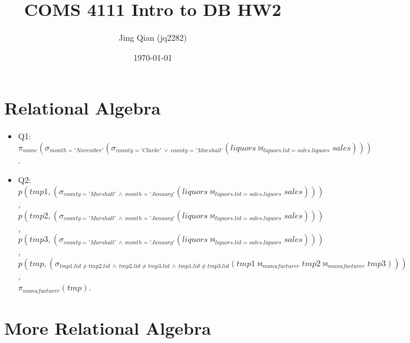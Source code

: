 \documentclass{article}
\title{COMS 4111 Intro to DB HW2}
\author{Jing Qian (jq2282)}
\date{\today}
\begin{document}
\maketitle



\pagebreak

\section{Relational Algebra}
\begin{itemize}
    \item Q1: \\
    $\pi_{name} (\sigma_{month='November'} (\sigma_{county='Clarke'\ \lor\ county = 'Marshall'} (liquors \bowtie_{liquors.lid = sales.liquors}sales))) $.
    
    \item Q2: \\
    $p(tmp1, (\sigma_{county = 'Marshall'\ \land\ month = 'January'} (liquors \bowtie_{liquors.lid = sales.liquors}sales)))$, \\
    $p(tmp2, (\sigma_{county = 'Marshall'\ \land\ month = 'January'} (liquors \bowtie_{liquors.lid = sales.liquors}sales)))$, \\
    $p(tmp3, (\sigma_{county = 'Marshall'\ \land\ month = 'January'} (liquors \bowtie_{liquors.lid = sales.liquors}sales)))$, \\
    $p(tmp, (\sigma_{tmp1.lid \neq tmp2.lid\ \land\ tmp2.lid \neq tmp3.lid\ \land\ tmp1.lid \neq tmp3.lid} (tmp1 \bowtie_{manufacturer}tmp2 \bowtie_{manufacturer}tmp3)))$, \\
    $\pi_{manufacturer} (tmp) $.

\end{itemize}

\newpage

\section{More Relational Algebra}
\end{document}
